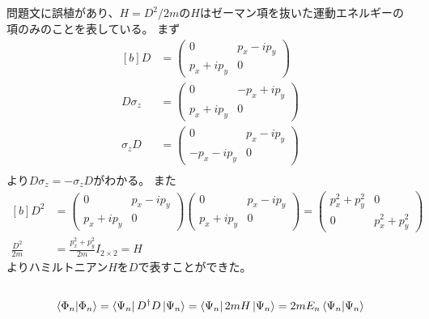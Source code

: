 \documentclass[../../sp_2015.tex]{subfiles}
\begin{document}
\subsection{}
問題文に誤植があり、\(H=D^2/2m\)の\(H\)はゼーマン項を抜いた運動エネルギーの項のみのことを表している。
まず
\begin{equation}\begin{aligned}[b]
    D &= \begin{pmatrix}
        0 & p_x-ip_y\\p_x+ip_y & 0
    \end{pmatrix}\\
    D\sigma_z &= \begin{pmatrix}
        0 & -p_x+ip_y\\p_x+ip_y & 0
    \end{pmatrix}\\
    \sigma_zD &= \begin{pmatrix}
        0 & p_x-ip_y\\-p_x-ip_y & 0
    \end{pmatrix}\\
\end{aligned}\end{equation}
より\(D\sigma_z=-\sigma_z D\)がわかる。
また
\begin{equation}\begin{aligned}[b]
    D^2 &= \begin{pmatrix}
        0 & p_x-ip_y\\p_x+ip_y & 0
    \end{pmatrix}\begin{pmatrix}
        0 & p_x-ip_y\\p_x+ip_y & 0
    \end{pmatrix}
    =\begin{pmatrix}
        p_x^2+p_y^2 & 0\\ 0 & p_x^2+p_y^2
    \end{pmatrix}\\
    \frac{D^2}{2m}&=\frac{p_x^2+p_y^2}{2m}I_{2\times2} = H
\end{aligned}\end{equation}
よりハミルトニアン\(H\)を\(D\)で表すことができた。

\subsection{}
\begin{equation}\begin{aligned}[b]
    \braket{\Phi_n}
    =\bra{\Psi_n}D^\dagger D\ket{\Psi_n}
    =\bra{\Psi_n}2mH\ket{\Psi_n}
    =2mE_n\braket{\Psi_n}
\end{aligned}\end{equation}
\end{document}
